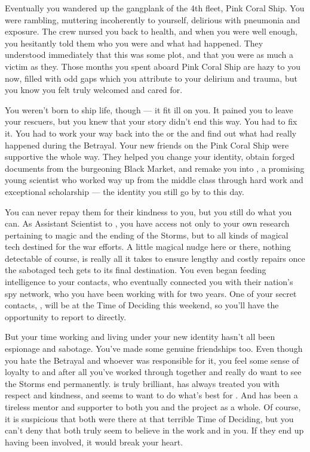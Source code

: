 \documentclass[char]{GL2020}
\begin{document}
Eventually you wandered up the gangplank of the 4th fleet, Pink Coral Ship. You were rambling, muttering incoherently to yourself, delirious with pneumonia and exposure. The crew nursed you back to health, and when you were well enough, you hesitantly told them who you were and what had happened. They understood immediately that this was some plot, and that you were as much a victim as they. Those months you spent aboard Pink Coral Ship are hazy to you now, filled with odd gaps which you attribute to your delirium and trauma, but you know you felt truly welcomed and cared for.

You weren't born to ship life, though — it fit ill on you. It pained you to leave your rescuers, but you knew that your story didn't end this way. You had to fix it. You had to work your way back into the \pFarm{} or the \pTech{} and find out what had really happened during the Betrayal. Your new friends on the Pink Coral Ship were supportive the whole way. They helped you change your identity, obtain forged documents from the burgeoning Black Market, and remake you into \cAssistantScientist{\full}, a promising young \pTech{} scientist who worked \cAssistantScientist{\their} way up from the middle class through hard work and exceptional scholarship — the identity you still go by to this day. 

You can never repay them for their kindness to you, but you still do what you can. As Assistant Scientist to \cHeadScientist{\intro}, you have access not only to your own research pertaining to magic and the ending of the Storms, but to all kinds of magical tech destined for the war efforts. A little magical nudge here or there, nothing detectable of course, is really all it takes to ensure lengthy and costly repairs once the sabotaged tech gets to its final destination. You even began feeding intelligence to your \pShip{} contacts, who eventually connected you with their nation’s spy network, who you have been working with for two years. One of your secret contacts, \cBunker{\intro}, will be at the Time of Deciding this weekend, so you'll have the opportunity to report to \cBunker{\them} directly.

But your time working and living under your new identity hasn’t all been espionage and sabotage. You’ve made some genuine friendships too. Even though you hate the Betrayal and whoever was responsible for it, you feel some sense of loyalty to \cHeadScientist{} and \cDiplomat{\intro} after all you've worked through together and really do want to see the Storms end permanently. \cHeadScientist{} is truly brilliant, has always treated you with respect and kindness, and seems to want to do what’s best for \pEarth{}. And \cDiplomat{} has been a tireless mentor and supporter to both you and the project as a whole. Of course, it is suspicious that both were there at that terrible Time of Deciding, but you can’t deny that both truly seem to believe in the work and in you. If they end up having been involved, it would break your heart.
\end{document}
